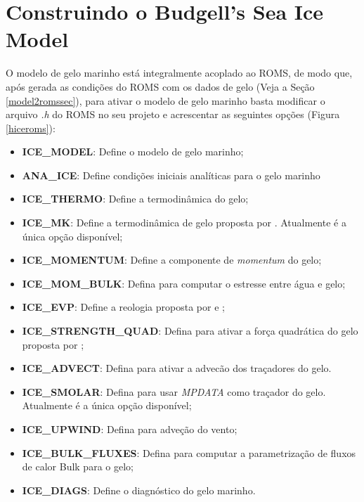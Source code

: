 \chapter{Construindo o Budgell's Sea Ice Model}
\bigskip

\noindent O modelo de gelo marinho está integralmente acoplado ao ROMS, de modo que, após gerada as condições do 
          ROMS com os dados de gelo (Veja a Seção \textcolor{bleu_cite}{\ref{model2romssec}}), para ativar o modelo 
          de gelo marinho basta modificar o arquivo \textit{.h} do ROMS no seu projeto e acrescentar as seguintes 
          opções (Figura \textcolor{bleu_cite}{\ref{hiceroms}}):
\bigskip

\begin{itemize}
    \item \textbf{ICE\_MODEL}: Define o modelo de gelo marinho;
    \item \textbf{ANA\_ICE}: Define condições iniciais analíticas para o gelo marinho 
    \item \textbf{ICE\_THERMO}: Define a termodinâmica do gelo;  
    \item \textbf{ICE\_MK}: Define a termodinâmica de gelo proposta por \textcite{Mellor1989}. Atualmente é a única opção disponível;
    \item \textbf{ICE\_MOMENTUM}: Define a componente de \textit{momentum} do gelo;
    \item \textbf{ICE\_MOM\_BULK}: Defina para computar o estresse entre água e gelo;
    \item \textbf{ICE\_EVP}: Define a reologia proposta por \textcite{Hunke1997} e \textcite{Hunke2001};
    \item \textbf{ICE\_STRENGTH\_QUAD}: Defina para ativar a força quadrática do gelo proposta por \textcite{Overland1988};
    \item \textbf{ICE\_ADVECT}: Defina para ativar a advecão dos traçadores do gelo.
    \item \textbf{ICE\_SMOLAR}: Defina para usar \textit{MPDATA} como traçador do gelo. Atualmente é a única opção disponível;   
    \item \textbf{ICE\_UPWIND}: Defina para adveção do vento;
    \item \textbf{ICE\_BULK\_FLUXES}: Defina para computar a parametrização de fluxos de calor Bulk para o gelo;
    \item \textbf{ICE\_DIAGS}: Define o diagnóstico do gelo marinho.
\end{itemize}
\bigskip


